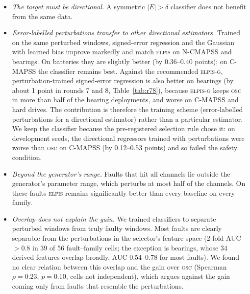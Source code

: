 \documentclass{esannV2}
\newcommand{\OSC}{\textsc{osc}}
\newcommand{\RPT}{\textsc{elpis}}
\newcommand{\AUTOD}{\textsc{elpis-g}}
\begin{document}
\begin{itemize}
\item \emph{The target must be directional.} A symmetric $|E|>\delta$ classifier does not benefit from the same data.
\item \emph{Error-labelled perturbations transfer to other directional estimators.} Trained on the same perturbed windows, signed-error regression and the Gaussian with learned bias improve markedly and match \RPT{} on N-CMAPSS and bearings. On batteries they are slightly better (by 0.36--0.40 points); on C-MAPSS the classifier remains best. Against the recommended \AUTOD, perturbation-trained signed-error regression is also better on bearings (by about 1 point in rounds 7 and 8, Table~\ref{tab:r78}), because \AUTOD{} keeps \OSC{} in more than half of the bearing deployments, and worse on C-MAPSS and hard drives. The contribution is therefore the training scheme (error-labelled perturbations for a directional estimator) rather than a particular estimator. We keep the classifier because the pre-registered selection rule chose it: on development seeds, the directional regressors trained with perturbations were worse than \OSC{} on C-MAPSS (by 0.12--0.53 points) and so failed the safety condition.
\item \emph{Beyond the generator's range.} Faults that hit all channels lie outside the generator's parameter range, which perturbs at most half of the channels. On these faults \RPT{} remains significantly better than every baseline on every family.
\item \emph{Overlap does not explain the gain.} We trained classifiers to separate perturbed windows from truly faulty windows. Most faults are clearly separable from the perturbations in the selector's feature space (2-fold AUC $>0.8$ in 39 of 56 fault--family cells; the exception is bearings, whose 34 derived features overlap broadly, AUC 0.54--0.78 for most faults). We found no clear relation between this overlap and the gain over \OSC{} (Spearman $\rho=0.23$, $p=0.10$, cells not independent), which argues against the gain coming only from faults that resemble the perturbations.
\end{itemize}
\end{document}
